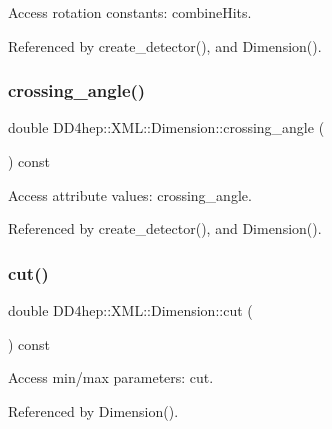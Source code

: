 Access rotation constants\+: combine\+Hits. 



Referenced by create\+\_\+detector(), and Dimension().

\hypertarget{struct_d_d4hep_1_1_x_m_l_1_1_dimension_aa69247b85a005c0dbfa5069b3e69862e}{}\label{struct_d_d4hep_1_1_x_m_l_1_1_dimension_aa69247b85a005c0dbfa5069b3e69862e} 
\subsubsection{\texorpdfstring{crossing\+\_\+angle()}{crossing\_angle()}}
{\footnotesize\ttfamily double D\+D4hep\+::\+X\+M\+L\+::\+Dimension\+::crossing\+\_\+angle (\begin{DoxyParamCaption}{ }\end{DoxyParamCaption}) const}



Access attribute values\+: crossing\+\_\+angle. 



Referenced by create\+\_\+detector(), and Dimension().

\hypertarget{struct_d_d4hep_1_1_x_m_l_1_1_dimension_a94b990b30f0e5260bd52acc1e110cc04}{}\label{struct_d_d4hep_1_1_x_m_l_1_1_dimension_a94b990b30f0e5260bd52acc1e110cc04} 
\subsubsection{\texorpdfstring{cut()}{cut()}\hspace{0.1cm}{\footnotesize\ttfamily [1/2]}}
{\footnotesize\ttfamily double D\+D4hep\+::\+X\+M\+L\+::\+Dimension\+::cut (\begin{DoxyParamCaption}{ }\end{DoxyParamCaption}) const}



Access min/max parameters\+: cut. 



Referenced by Dimension().

\hypertarget{struct_d_d4hep_1_1_x_m_l_1_1_dimension_a683f6534840435ecabf52f74f05700cd}{}\label{struct_d_d4hep_1_1_x_m_l_1_1_dimension_a683f6534840435ecabf52f74f05700cd} 
